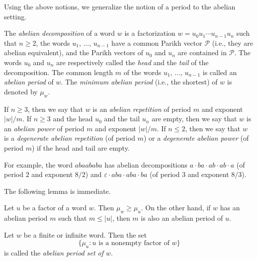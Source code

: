 \documentclass[a4paper,fleqn]{article}
\providecommand{\abs}[1]{\lvert#1\rvert}
\begin{document}
  Using the above notions, we generalize the notion of a period to the abelian setting.

  \begin{definition}\label{def:abelian_period}
    The \emph{abelian decomposition} of a word $w$ is a factorization $w = u_0 u_1 \dotsm u_{n-1} u_n$ such that
    $n \geq 2$, the words $u_1$, $\ldots$, $u_{n-1}$ have a common Parikh vector $\mathcal{P}$ (i.e., they are abelian
    equivalent), and the Parikh vectors of $u_0$ and $u_n$ are contained in $\mathcal{P}$. The words $u_0$ and $u_n$
    are respectively called the \emph{head} and the \emph{tail} of the decomposition. The common length $m$ of the
    words $u_1$, $\ldots$, $u_{n-1}$ is called an \emph{abelian period} of $w$. The \emph{minimum abelian period}
    (i.e., the shortest) of $w$ is denoted by $\mu_w$.

    If $n \geq 3$, then we say that $w$ is an \emph{abelian repetition} of period $m$ and exponent $\abs{w}/m$. If
    $n \geq 3$ and the head $u_0$ and the tail $u_n$ are empty, then we say that $w$ is an \emph{abelian power} of
    period $m$ and exponent $\abs{w}/m$. If $n \leq 2$, then we say that $w$ is a \emph{degenerate abelian repetition}
    (of period $m$) or a \emph{degenerate abelian power} (of period $m$) if the head and tail are empty.
  \end{definition}

  For example, the word $abaababa$ has abelian decompositions $a \cdot ba \cdot ab \cdot ab \cdot a$ (of period $2$ and
  exponent $8/2$) and $\varepsilon \cdot aba \cdot aba \cdot ba$ (of period $3$ and exponent $8/3$).

  The following lemma is immediate.

  \begin{lemma}\label{lem:abelian_period_covering}
    Let $u$ be a factor of a word $w$. Then $\mu_w \geq \mu_u$. On the other hand, if $w$ has an abelian period $m$
    such that $m \leq \abs{u}$, then $m$ is also an abelian period of $u$.
  \end{lemma}

  \begin{definition}
    Let $w$ be a finite or infinite word. Then the set
    \begin{equation*}
      \{\mu_u : \text{$u$ is a nonempty factor of $w$}\}
    \end{equation*}
    is called the \emph{abelian period set of $w$}.
  \end{definition}
\end{document}
